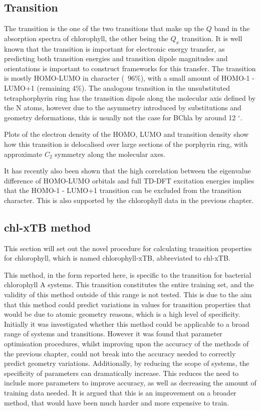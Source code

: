 \subsection{\Qy Transition}
The \Qy transition is the one of the two transitions that make up
the $Q$ band in the absorption spectra of chlorophyll, the other being the $Q_x$
transition. It is well known that the \Qy transition is important for electronic 
energy transfer, as predicting both transition energies and transition dipole 
magnitudes and orientations is important to construct frameworks for this transfer.
The \Qy transition is mostly HOMO-LUMO in character (~96\%), with a small amount of HOMO-1
- LUMO+1 (remaining 4\%). The analogous transition in the unsubstituted tetraphorphyrin
ring has the transition dipole along the molecular axis defined by the N atoms,
however due to the asymmetry introduced by substitutions and geometry deformations,
this is usually not the case for BChla by around 12 $^{\circ}$.

Plots of the electron density of the HOMO, LUMO and transition density show how
this transition is delocalised over large sections of the porphyrin ring, with 
approximate $C_2$ symmetry along the molecular axes.

It has recently also been shown that the high correlation between the eigenvalue
difference of HOMO-LUMO orbitals and full TD-DFT excitation energies implies that
the HOMO-1 - LUMO+1 transition can be excluded from the transition character. This
is also supported by the chlorophyll data in the previous chapter.

\subsection{chl-xTB method}
\label{subsec:chl_method}
This section will set out the novel procedure for calculating transition properties
for chlorophyll, which is named chlorophyll-xTB, abbreviated to chl-xTB.

This method, in the form reported here, is specific to the \Qy transition for 
bacterial chlorophyll A systems. This transition constitutes the entire training
set, and the validity of this method outside of this range is not tested. This is
due to the aim that this method could predict variations in values for transition
properties that would be due to atomic geometry reasons, which is a high level of
specificity.
Initially it was investigated whether this method could be applicable to a broad
range of systems and transitions. However it was found that parameter optimisation
procedures, whilst improving upon the accuracy of the \dxtb methods of the previous
chapter, could not break into the accuracy needed to correctly predict geometry variations.
Additionally, by reducing the scope of systems, the specificity of parameters can
dramatically increase. This reduces the need to include more parameters to improve
accuracy, as well as decreasing the amount of training data needed. It is
argued that this is an improvement on a broader method, that would have been much
harder and more expensive to train.

